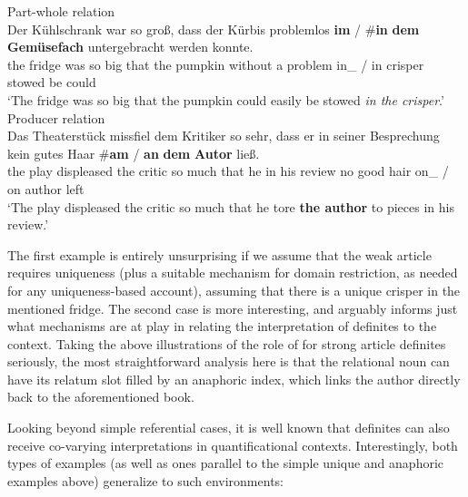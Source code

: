 \documentclass[output=paper
,modfonts
,nonflat]{langscibook}
\begin{document}
\begin{exe}
\ex\label{ex:schwarz:11} 
\begin{xlist}
\ex\label{ex:schwarz:11a} {Part-whole relation}\\\gll Der K\"uhlschrank war so gro\ss , dass der K\"urbis problemlos \textbf{im} \textnormal{/} \textnormal{\#}\textbf{in} \textbf{dem} \textbf{Gem\"usefach} untergebracht werden konnte.\\
the fridge was so big that the pumpkin {without a problem} {in\_\theweak} / {\phantom{\#}}{in} {\thestrong} {crisper} stowed be could\\
\glt`The fridge was so big that the pumpkin could easily be stowed
\textit{in the crisper}.'   
\ex\label{ex:schwarz:11b} Producer relation\\\gll Das Theaterst\"uck missfiel dem Kritiker so sehr, dass er in seiner Besprechung kein gutes Haar \textnormal{\#}\textbf{am} \textnormal{/} \textbf{an} \textbf{dem} \textbf{Autor} lie\ss . \\
the play displeased the critic so much that he in his review no good hair {\phantom{\#}}{on\_\theweak} / {on} {\thestrong} {author} left\\
\glt `The play displeased the critic so much that he tore \textbf{the
  author} to pieces in his review.' 
\end{xlist}
\end{exe}

The first example is entirely unsurprising if we assume that the weak
article requires uniqueness (plus a suitable mechanism for domain
restriction, as needed for any uniqueness-based account), assuming that there is a unique crisper
in the mentioned fridge. The second case is more interesting, and
arguably informs just what mechanisms are at play in relating the
interpretation of definites to the context. Taking the above
illustrations of the role of  for strong article definites
seriously, the most straightforward analysis here is that the
relational noun can have its relatum slot filled by an anaphoric
index, which links the author directly back to the aforementioned
book.

Looking beyond simple referential cases, it is well known that
definites can also receive co-varying interpretations in
quantificational contexts. Interestingly, both types of 
examples (as well as ones parallel to the simple unique and anaphoric
examples above) generalize to such environments:
\end{document}
